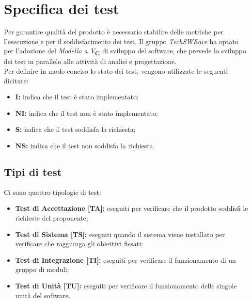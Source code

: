 \section{Specifica dei test}
Per garantire qualità del prodotto è necessario stabilire delle metriche per l’esecuzione e per il soddisfacimento dei test. 
Il gruppo \textit{TechSWEave} ha optato per l'adozione del \textit{Modello a V}\textsubscript{\textbf{G}} di sviluppo del software, che 
prevede lo sviluppo dei test in parallelo alle attività di analisi e progettazione.\\
Per definire in modo conciso lo stato dei test, vengono utilizzate le seguenti diciture:
\begin{itemize}
    \item \textbf{I:} indica che il test è stato implementato;
    \item \textbf{NI:} indica che il test non è stato implementato;
    \item \textbf{S:} indica che il test soddisfa la richiesta;
    \item \textbf{NS:} indica che il test non soddisfa la richiesta.
\end{itemize}
\subsection{Tipi di test}
Ci sono quattro tipologie di test:
\begin{itemize}
    \item \textbf{Test di Accettazione [TA]:} eseguiti per verificare che il prodotto soddisfi le richieste del proponente;
    \item \textbf{Test di Sistema [TS]:} eseguiti quando il sistema viene installato per verificare che raggiunga gli obiettivi fissati;
    \item \textbf{Test di Integrazione [TI]:} eseguiti per verificare il funzionamento di un gruppo di moduli;
    \item \textbf{Test di Unit\`a [TU]:} eseguiti per verificare il funzionamento delle singole unit\`a del software.
\end{itemize}
